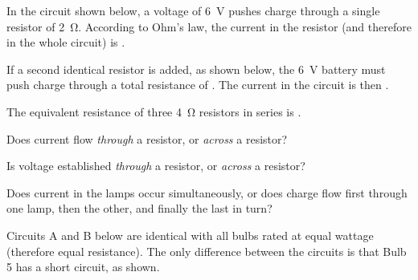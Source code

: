 \documentclass[]{exam}
\begin{document}
\begin{questions}
\question 
In the circuit shown below, a voltage of \SI{6}{V} pushes charge through a single resistor of \SI{2}{\ohm}. According to Ohm's law, the current in the resistor (and therefore in the whole circuit) is \fillin[\SI{3}{A}].

\begin{center}
\end{center}

\question
If a second identical resistor is added, as shown below, the \SI{6}{V} battery must push charge through a total resistance of \fillin[\SI{6}{\ohm}].
The current in the circuit is then \fillin[\SI{1}{A}].

\begin{center}
\end{center}


\question
The equivalent resistance of three \SI{4}{\ohm} resistors in series is \fillin[\SI{12}{\ohm}].

\question
Does current flow \textit{through} a resistor, or \textit{across} a resistor? \fillin[through]

Is voltage established \textit{through} a resistor, or \textit{across} a resistor? \fillin[across]


\question
Does current in the lamps occur simultaneously, or does charge flow first through one lamp, then the other, and finally the last in turn?




\question 
Circuits A and B below are identical with all bulbs rated at equal wattage (therefore equal resistance). The only difference between the circuits is that Bulb 5 has a short circuit, as shown.


\end{questions}
\end{document}
